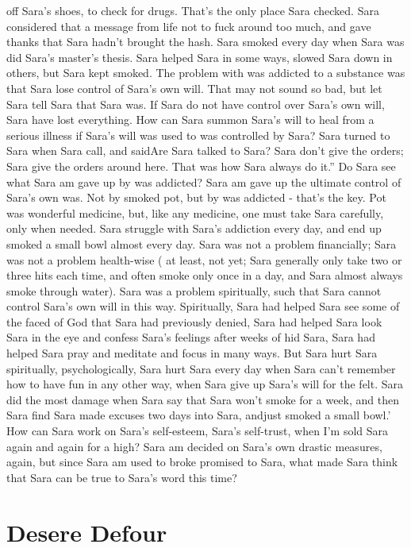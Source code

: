 \documentclass[12pt]{book}
\begin{document}
off Sara's shoes, to check for drugs. That's the only place Sara checked. Sara considered that a message from life not to fuck around too much, and gave thanks that Sara hadn't brought the hash. Sara smoked every day when Sara was did Sara's master's thesis. Sara helped Sara in some ways, slowed Sara down in others, but Sara kept smoked. The problem with was addicted to a substance was that Sara lose control of Sara's own will. That may not sound so bad, but let Sara tell Sara that Sara was. If Sara do not have control over Sara's own will, Sara have lost everything. How can Sara summon Sara's will to heal from a serious illness if Sara's will was used to was controlled by Sara? Sara turned to Sara when Sara call, and saidAre Sara talked to Sara? Sara don't give the orders; Sara give the orders around here. That was how Sara always do it.'' Do Sara see what Sara am gave up by was addicted? Sara am gave up the ultimate control of Sara's own was. Not by smoked pot, but by was addicted - that's the key. Pot was wonderful medicine, but, like any medicine, one must take Sara carefully, only when needed. Sara struggle with Sara's addiction every day, and end up smoked a small bowl almost every day. Sara was not a problem financially; Sara was not a problem health-wise ( at least, not yet; Sara generally only take two or three hits each time, and often smoke only once in a day, and Sara almost always smoke through water). Sara was a problem spiritually, such that Sara cannot control Sara's own will in this way. Spiritually, Sara had helped Sara see some of the faced of God that Sara had previously denied, Sara had helped Sara look Sara in the eye and confess Sara's feelings after weeks of hid Sara, Sara had helped Sara pray and meditate and focus in many ways. But Sara hurt Sara spiritually, psychologically, Sara hurt Sara every day when Sara can't remember how to have fun in any other way, when Sara give up Sara's will for the felt. Sara did the most damage when Sara say that Sara won't smoke for a week, and then Sara find Sara made excuses two days into Sara, andjust smoked a small bowl.' How can Sara work on Sara's self-esteem, Sara's self-trust, when I'm sold Sara again and again for a high? Sara am decided on Sara's own drastic measures, again, but since Sara am used to broke promised to Sara, what made Sara think that Sara can be true to Sara's word this time?



\chapter{Desere Defour}
\end{document}
